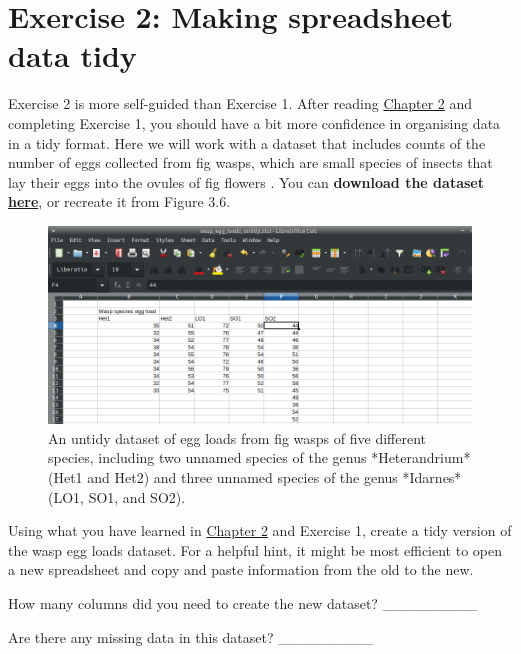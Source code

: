\documentclass[
]{scrbook}
\begin{document}
\hypertarget{exercise-2-making-spreadsheet-data-tidy}{%
\section{Exercise 2: Making spreadsheet data tidy}\label{exercise-2-making-spreadsheet-data-tidy}}

Exercise 2 is more self-guided than Exercise 1.
After reading \protect\hyperlink{Chapter_2}{Chapter 2} and completing Exercise 1, you should have a bit more confidence in organising data in a tidy format.
Here we will work with a dataset that includes counts of the number of eggs collected from fig wasps, which are small species of insects that lay their eggs into the ovules of fig flowers \citep{Weiblen2002}.
You can \textbf{download the dataset \href{https://raw.githubusercontent.com/bradduthie/statistical_techniques/main/data/wasp_egg_loads_untidy.csv}{here}}, or recreate it from Figure 3.6.

\begin{figure}
\includegraphics[width=1\linewidth]{img/wasp_egg_loads_untidy} \caption{An untidy dataset of egg loads from fig wasps of five different species, including two unnamed species of the genus *Heterandrium* (Het1 and Het2) and three unnamed species of the genus *Idarnes* (LO1, SO1, and SO2).}\label{fig:unnamed-chunk-13}
\end{figure}

Using what you have learned in \protect\hyperlink{Chapter_2}{Chapter 2} and Exercise 1, create a tidy version of the wasp egg loads dataset.
For a helpful hint, it might be most efficient to open a new spreadsheet and copy and paste information from the old to the new.

How many columns did you need to create the new dataset? \_\_\_\_\_\_\_\_\_

Are there any missing data in this dataset? \_\_\_\_\_\_\_\_\_
\end{document}
